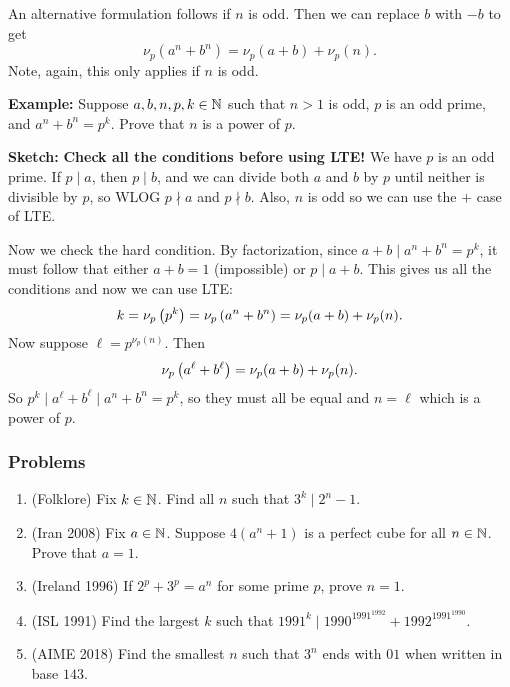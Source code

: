 \documentclass[11pt,paper=letter]{scrartcl}
\begin{document}
\vspace{1em}
\noindent An alternative formulation follows if $n$ is odd. Then we can replace $b$ with $-b$ to get
$$\nu_p(a^n + b^n) = \nu_p(a + b) + \nu_p(n).$$
Note, again, this only applies if $n$ is odd.

\vspace{1em}
\noindent \textbf{Example:} Suppose $a, b, n, p, k \in \mathbb N$ such that $n > 1$ is odd, $p$ is an odd prime, and $a^n + b^n = p^k$. Prove that $n$ is a power of $p$.

\vspace{1em}
\noindent \textbf{Sketch:} \textbf{Check all the conditions before using LTE!} We have $p$ is an odd prime. If $p \mid a$, then $p \mid b$, and we can divide both $a$ and $b$ by $p$ until neither is divisible by $p$, so WLOG $p \nmid a$ and $p \nmid b$. Also, $n$ is odd so we can use the $+$ case of LTE.

Now we check the hard condition. By factorization, since $a + b \mid a^n + b^n = p^k$, it must follow that either $a + b = 1$ (impossible) or $p \mid a + b$. This gives us all the conditions and now we can use LTE:
$$k = \nu_p\left( p^k \right) = \nu_p\left( a^n + b^n \right) = \nu_p(a + b) + \nu_p(n).$$
Now suppose $\ell = p^{\nu_p(n)}$. Then
$$\nu_p\left( a^{\ell} + b^{\ell} \right) = \nu_p(a + b) + \nu_p(n).$$
So $p^k \mid a^{\ell} + b^{\ell} \mid a^n + b^n = p^k$, so they must all be equal and $n = \ell$ which is a power of $p$.

\subsubsection*{Problems}

\begin{enumerate}
  \item (Folklore) Fix $k \in \mathbb N$. Find all $n$ such that $3^k \mid 2^n - 1$.

  \item (Iran 2008) Fix $a \in \mathbb N$. Suppose $4(a^n + 1)$ is a perfect cube for all $n \in \mathbb N$. Prove that $a = 1$.

  \item (Ireland 1996) If $2^p + 3^p = a^n$ for some prime $p$, prove $n = 1$.

  \item (ISL 1991) Find the largest $k$ such that $1991^k \mid 1990^{1991^{1992}} + 1992^{1991^{1990}}$.

  \item (AIME 2018) Find the smallest $n$ such that $3^n$ ends with $01$ when written in base $143$.
\end{enumerate}
\end{document}
